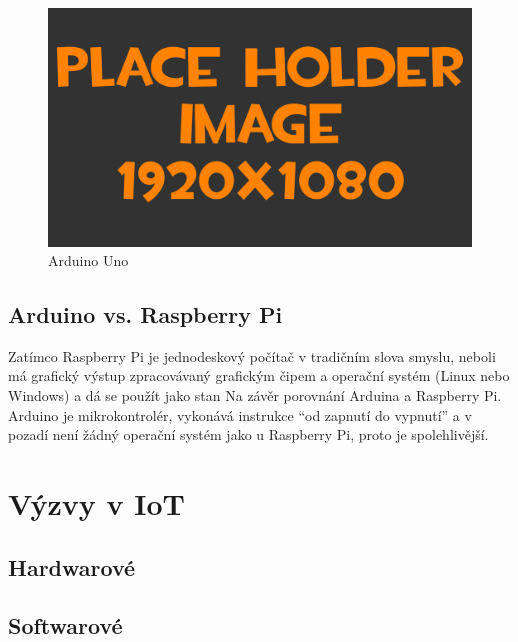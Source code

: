 \begin{figure}[h!]
	\centering
	\includegraphics[width=\textwidth]{pictures/placeHolderFHD.png}
    	\caption{Arduino Uno}
   	\label{fig:arduinoUno}
\end{figure}	

\subsection{Arduino vs. Raspberry Pi}
Zatímco Raspberry Pi je jednodeskový počítač v tradičním slova smyslu, neboli má grafický výstup zpracovávaný grafickým čipem a operační systém (Linux nebo Windows) a dá se použít jako stan
Na závěr porovnání Arduina a Raspberry Pi. Arduino je mikrokontrolér, vykonává instrukce “od zapnutí do vypnutí” a v pozadí není žádný operační systém jako u Raspberry Pi, proto je spolehlivější.


\section{Výzvy v IoT}
\subsection{Hardwarové}
\subsection{Softwarové}
